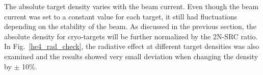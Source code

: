    The absolute target density varies with the beam current. Even though the beam current was set to a constant value for each target, it still had fluctuations depending on the stability of the beam. As discussed in the previous section, the absolute density for cryo-targets will be further normalized by the 2N-SRC ratio. In Fig.~\ref{he4_rad_check}, the radiative effect at different target densities was also examined and the results showed very small deviation when changing the density by  $\mathrm{\pm}$ 10\%.
   
    
